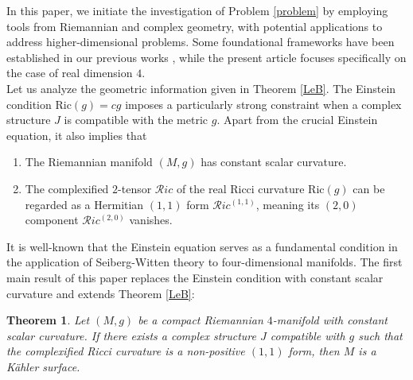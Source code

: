 \documentclass[12pt, reqno]{amsart} \usepackage{pifont} \usepackage{mathrsfs}
\theoremstyle{plain} \newtheorem{thm}{Theorem}[section]
\theoremstyle{definition} \newtheorem{example}[thm]{Example}
\newcommand{\btheorem}{\begin{thm}} \newcommand{\etheorem}{\end{thm}}
\newcommand{\bd}{\begin{enumerate}} \newcommand{\ed}{\end{enumerate}}
\renewcommand{\S}{{\mathbb S}} \newcommand{\Y}{{\mathbb Y}}
\renewcommand{\>}{\rightarrow}
\numberwithin{equation}{section} %
\begin{document}
	
	
	In this paper, we initiate the investigation of Problem \ref{problem} by
	employing tools from Riemannian and complex geometry, with potential
	applications to address higher-dimensional problems. Some foundational
	frameworks have been established in our previous works \cite{LY12, LY17,
		Yang19, Yang20, WY25, Yang25}, while the present article focuses specifically
	on the case of real dimension $4$.\\
	
	 Let us analyze the geometric information
	given in Theorem \ref{LeB}. The Einstein condition $
	\mathrm{Ric}(g)=cg$ imposes a particularly strong constraint when a complex
	structure $J$ is compatible with the metric $g$. Apart from the crucial
	Einstein equation, it also  implies that \bd \item The Riemannian manifold
	$(M,g)$ has constant scalar curvature. \item The complexified $2$-tensor
	$\mathscr Ric$ of the real Ricci curvature $\mathrm{Ric}(g)$ can be regarded as 
	a Hermitian $(1,1)$ form $\mathscr Ric^{(1,1)}$, meaning its $(2,0)$ component
	$\mathscr Ric^{(2,0)}$ vanishes. \ed
	
	\baselineskip
	
	It is well-known that the Einstein equation serves as a fundamental condition
	in the application of Seiberg-Witten theory to four-dimensional manifolds. The
	first main result of this paper replaces the Einstein condition with constant
	scalar curvature and  extends Theorem \ref{LeB}: \btheorem \label{main}  Let
	$(M,g)$ be a compact Riemannian $4$-manifold with constant scalar curvature. If
	there exists a complex structure $J$ compatible with $g$ such that the
	complexified Ricci curvature is a non-positive $(1,1)$ form, then $M$ is a
	K\"ahler surface. \etheorem
	
	
	
\end{document}
